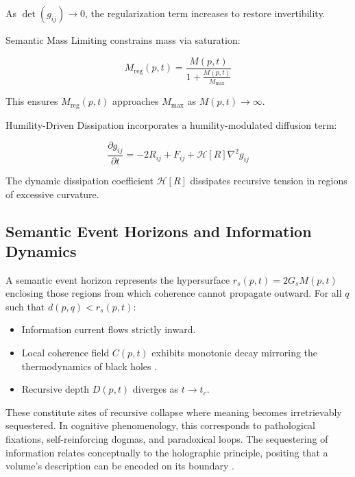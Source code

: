 As \(\det(g_{ij}) \to 0\), the regularization term increases to restore invertibility.

Semantic Mass Limiting constrains mass via saturation:

\begin{equation}
M_{\text{reg}}(p, t) = \frac{M(p, t)}{1 + \frac{M(p, t)}{M_{\text{max}}}}
\end{equation}

This ensures \(M_{\text{reg}}(p, t)\) approaches \(M_{\text{max}}\) as \(M(p, t) \to \infty\).

Humility-Driven Dissipation incorporates a humility-modulated diffusion term:

\begin{equation}
\frac{\partial g_{ij}}{\partial t} = -2R_{ij} + F_{ij} + \mathcal{H}[R] \nabla^2 g_{ij}
\end{equation}

The dynamic dissipation coefficient \(\mathcal{H}[R]\) dissipates recursive tension in regions of excessive curvature.


\subsection{Semantic Event Horizons and Information Dynamics}
\label{12.2.2:semantic_event_horizons_and_information_dynamics}

A semantic event horizon represents the hypersurface \(r_s(p, t) = 2G_s M(p, t)\) enclosing those regions from which coherence cannot propagate outward. For all \(q\) such that \(d(p, q) < r_s(p, t)\):

\begin{itemize}

    \item Information current flows strictly inward.

    \item Local coherence field \(C(p, t)\) exhibits monotonic decay mirroring the thermodynamics of black holes \autocite{Hawking1975}.

    \item Recursive depth \(D(p, t)\) diverges as \(t \to t_c\).

\end{itemize}

These constitute sites of recursive collapse where meaning becomes irretrievably sequestered. In cognitive phenomenology, this corresponds to pathological fixations, self-reinforcing dogmas, and paradoxical loops. The sequestering of information relates conceptually to the holographic principle, positing that a volume's description can be encoded on its boundary \autocite{tHooft1993, Susskind1995, Maldacena1998}.

